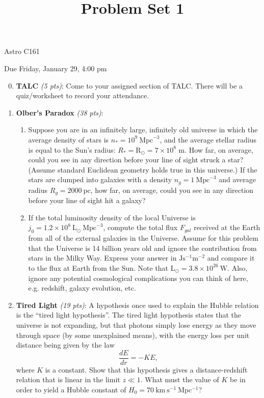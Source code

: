 \documentclass[12pt,preprint]{aastex}
\title{Problem Set 1}
\def\Mpc{\mathrm{Mpc}}
\def\pc{\mathrm{pc}}
\def\Rsol{\mathrm{R_\odot}}
\def\Lsol{\mathrm{L_\odot}}
\begin{document}
\maketitle
\centerline{Astro C161} 

\centerline{Due Friday, January 29, 4:00 pm}

\begin{enumerate}
\setcounter{enumi}{-1}

\item \textbf{TALC} \textit{(5 pts)}: Come to your assigned section of TALC. There will be a quiz/worksheet to record your attendance.

\item \textbf{Olber's Paradox} \textit{(38 pts)}: 
	\begin{enumerate}
	\item Suppose you are in an infinitely large, infinitely old universe in which the average density of stars is $n_* = 10^9 \ \Mpc^{-3}$, and the average stellar radius is equal to the Sun's radius: $R_* = \Rsol = 7 \times 10^8$ m. How far, on average, could you see in any direction before your line of sight struck a star? (Assume standard Euclidean geometry holds true in this universe.) If the stars are clumped into galaxies with a density $n_g = 1\ \Mpc^{-3}$ and average radius $R_g = 2000\ \pc$, how far, on average, could you see in any direction before your line of sight hit a galaxy?
	\item If the total luminosity density of the local Universe is $j_0 = 1.2 \times 10^8\ \Lsol\ \Mpc^{-3}$, compute the total flux $F_{gal}$ received at the Earth from all of the external galaxies in the Universe. Assume for this problem that the Universe is 14 billion years old and ignore the contribution from stars in the Milky Way. Express your answer in $\mathrm{J s^{-1} m^{-2}}$ and compare it to the flux at Earth from the Sun. Note that $\Lsol = 3.8 \times 10^{26}\  \mathrm{W}$. Also, ignore any potential cosmological complications you can think of here, e.g. redshift, galaxy evolution, etc.
	\end{enumerate}

\item \textbf{Tired Light} \textit{(19 pts)}: A hypothesis once used to explain the Hubble relation is the ``tired light hypothesis''. The tired light hypothesis states that the universe is not expanding, but that photons simply lose energy as they move through space (by some unexplained means), with the energy loss per unit distance being given by the law 
$$ \frac{d E}{d r} = - K E, $$
where $K$ is a constant. Show that this hypothesis gives a distance-redshift relation that is linear in the limit $z \ll 1$. What must the value of $K$ be in order to yield a Hubble constant of $H_0 = 70\ \mathrm{km\ s^{-1}\ Mpc^{-1}}$?


\end{enumerate}
\end{document}
